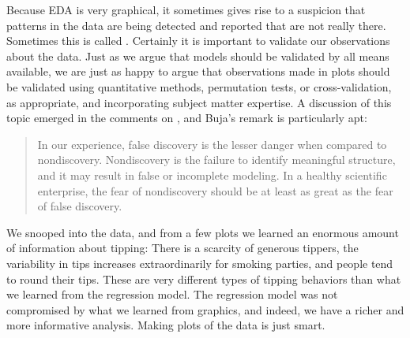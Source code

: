 



\vspace{1em}


  Because EDA is very graphical,
it sometimes gives rise to a suspicion that patterns in the data are
being detected and reported that are not really there.  Sometimes this
is called .  Certainly it is important to validate
our observations about the data.  Just as we argue that models should
be validated by all means available, we are just as happy to argue
that observations made in plots should be validated using quantitative
methods, permutation tests, or cross-validation, as appropriate, and
incorporating subject matter expertise. A discussion of this topic
emerged in the comments on , and Buja's remark
\cite{BujaKS96} is particularly apt:

\begin{quotation}
In our experience, false discovery is the lesser danger when
compared to nondiscovery.  Nondiscovery is the failure to identify
meaningful structure, and it may result in false or incomplete
modeling.  In a healthy scientific enterprise, the fear of
nondiscovery should be at least as great as the fear of false
discovery.
\end{quotation}

We snooped into the  data, and from a few plots we learned an
enormous amount of information about tipping: There is a scarcity of
generous tippers, the variability in tips increases extraordinarily
for smoking parties, and people tend to round their tips. These are
very different types of tipping behaviors than what we learned from
the regression model. The regression model was not compromised by what
we learned from graphics, and indeed, we have a richer and more
informative analysis. Making plots of the data is just smart.

